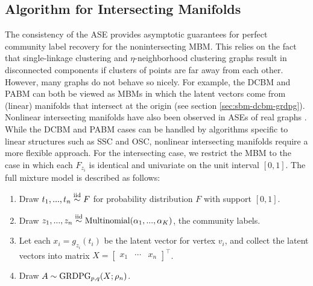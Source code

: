 \documentclass[
  11pt,
]{article}
\providecommand{\tightlist}{%
  \setlength{\itemsep}{0pt}\setlength{\parskip}{0pt}}
\theoremstyle{definition}
\theoremstyle{definition}
\theoremstyle{definition}
\theoremstyle{definition}
\theoremstyle{remark}
\begin{document}
\hypertarget{sec:intersect}{%
\subsection{Algorithm for Intersecting Manifolds}\label{sec:intersect}}

The consistency of the ASE provides asymptotic guarantees for perfect community label recovery for the nonintersecting MBM.
This relies on the fact that single-linkage clustering and \(\eta\)-neighborhood clustering graphs result in disconnected components if clusters of points are far away from each other.
However, many graphs do not behave so nicely.
For example, the DCBM and PABM can both be viewed as MBMs in which the latent vectors come from (linear) manifolds that intersect at the origin (see section \ref{sec:sbm-dcbm-grdpg}).
Nonlinear intersecting manifolds have also been observed in ASEs of real graphs \citep{SannaPassino2022, https://doi.org/10.48550/arxiv.1709.05454}.
While the DCBM and PABM cases can be handled by algorithms specific to linear structures such as SSC and OSC, nonlinear intersecting manifolds require a more flexible approach.
For the intersecting case, we restrict the MBM to the case in which each \(F_{z_i}\) is identical and univariate on the unit interval \([0, 1]\).
The full mixture model is described as follows:

\begin{enumerate}
\def\labelenumi{\arabic{enumi}.}
\tightlist
\item
  Draw \(t_1, ..., t_n \stackrel{\mathrm{iid}}{\sim} F\) for probability distribution \(F\) with support \([0, 1]\).
\item
  Draw \(z_1, ..., z_n \stackrel{\mathrm{iid}}{\sim} \mathrm{Multinomial}(\alpha_1, ..., \alpha_K)\), the community labels.
\item
  Let each \(x_i = g_{z_i}(t_i)\) be the latent vector for vertex \(v_i\), and collect the latent vectors into matrix \(X = \begin{bmatrix} x_1 & \cdots & x_n \end{bmatrix}^\top\).
\item
  Draw \(A \sim \mathrm{GRDPG}_{p,q}(X; \rho_n)\).
\end{enumerate}
\end{document}

